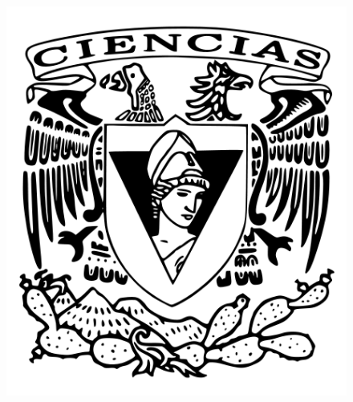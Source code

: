 \begin{center}
    \begin{figure}[b]
        \raggedleft
        \includegraphics[scale=0.165]{Facultad de Ciencias.png}
    \end{figure}
\end{center}